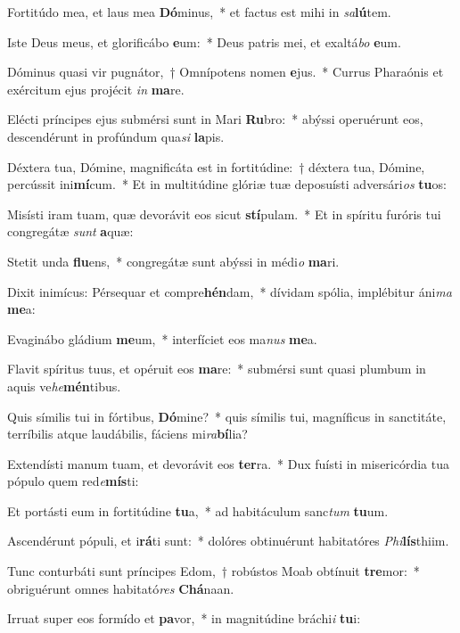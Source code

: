 \item Fortitúdo mea, et laus mea \textbf{Dó}minus,~* et factus est mihi in \textit{sa}\textbf{lú}tem.
\item Iste Deus meus, et glorificábo \textbf{e}um:~* Deus patris mei, et exaltá\textit{bo} \textbf{e}um.
\item Dóminus quasi vir pugnátor,~† Omnípotens nomen \textbf{e}jus.~* Currus Pharaónis et exércitum ejus projécit \textit{in} \textbf{ma}re.
\item Elécti príncipes ejus submérsi sunt in Mari \textbf{Ru}bro:~* abýssi operuérunt eos, descendérunt in profúndum qua\textit{si} \textbf{la}pis.
\item Déxtera tua, Dómine, magnificáta est in fortitúdine:~† déxtera tua, Dómine, percússit ini\textbf{mí}cum.~* Et in multitúdine glóriæ tuæ deposuísti adversári\textit{os} \textbf{tu}os:
\item Misísti iram tuam, quæ devorávit eos sicut \textbf{stí}pulam.~* Et in spíritu furóris tui congregátæ \textit{sunt} \textbf{a}quæ:
\item Stetit unda \textbf{flu}ens,~* congregátæ sunt abýssi in médi\textit{o} \textbf{ma}ri.
\item Dixit inimícus: Pérsequar et compre\textbf{hén}dam,~* dívidam spólia, implébitur áni\textit{ma} \textbf{me}a:
\item Evaginábo gládium \textbf{me}um,~* interfíciet eos ma\textit{nus} \textbf{me}a.
\item Flavit spíritus tuus, et opéruit eos \textbf{ma}re:~* submérsi sunt quasi plumbum in aquis ve\textit{he}\textbf{mén}tibus.
\item Quis símilis tui in fórtibus, \textbf{Dó}mine?~* quis símilis tui, magníficus in sanctitáte, terríbilis atque laudábilis, fáciens mi\textit{ra}\textbf{bí}lia?
\item Extendísti manum tuam, et devorávit eos \textbf{ter}ra.~* Dux fuísti in misericórdia tua pópulo quem red\textit{e}\textbf{mís}ti:
\item Et portásti eum in fortitúdine \textbf{tu}a,~* ad habitáculum sanc\textit{tum} \textbf{tu}um.
\item Ascendérunt pópuli, et i\textbf{rá}ti sunt:~* dolóres obtinuérunt habitatóres \textit{Phi}\textbf{lís}thiim.
\item Tunc conturbáti sunt príncipes Edom,~† robústos Moab obtínuit \textbf{tre}mor:~* obriguérunt omnes habitató\textit{res} \textbf{Chá}naan.
\item Irruat super eos formído et \textbf{pa}vor,~* in magnitúdine bráchi\textit{i} \textbf{tu}i:
